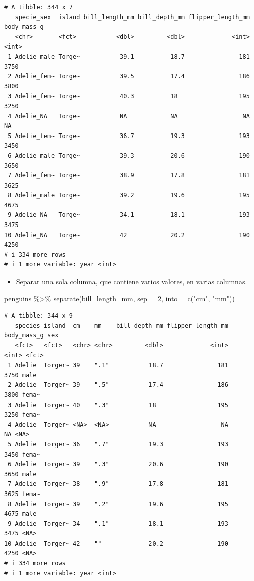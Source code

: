 \documentclass[
  letterpaper,
  DIV=11,
  numbers=noendperiod]{scrreprt}
\newenvironment{Shaded}{\begin{snugshade}}{\end{snugshade}}
\newcommand{\AttributeTok}[1]{\textcolor[rgb]{0.40,0.45,0.13}{#1}}
\newcommand{\DecValTok}[1]{\textcolor[rgb]{0.68,0.00,0.00}{#1}}
\newcommand{\FunctionTok}[1]{\textcolor[rgb]{0.28,0.35,0.67}{#1}}
\newcommand{\NormalTok}[1]{\textcolor[rgb]{0.00,0.23,0.31}{#1}}
\newcommand{\SpecialCharTok}[1]{\textcolor[rgb]{0.37,0.37,0.37}{#1}}
\newcommand{\StringTok}[1]{\textcolor[rgb]{0.13,0.47,0.30}{#1}}
\providecommand{\tightlist}{%
  \setlength{\itemsep}{0pt}\setlength{\parskip}{0pt}}\usepackage{longtable,booktabs,array}
\begin{document}
\begin{verbatim}
# A tibble: 344 x 7
   specie_sex  island bill_length_mm bill_depth_mm flipper_length_mm body_mass_g
   <chr>       <fct>           <dbl>         <dbl>             <int>       <int>
 1 Adelie_male Torge~           39.1          18.7               181        3750
 2 Adelie_fem~ Torge~           39.5          17.4               186        3800
 3 Adelie_fem~ Torge~           40.3          18                 195        3250
 4 Adelie_NA   Torge~           NA            NA                  NA          NA
 5 Adelie_fem~ Torge~           36.7          19.3               193        3450
 6 Adelie_male Torge~           39.3          20.6               190        3650
 7 Adelie_fem~ Torge~           38.9          17.8               181        3625
 8 Adelie_male Torge~           39.2          19.6               195        4675
 9 Adelie_NA   Torge~           34.1          18.1               193        3475
10 Adelie_NA   Torge~           42            20.2               190        4250
# i 334 more rows
# i 1 more variable: year <int>
\end{verbatim}

\begin{itemize}
\tightlist
\item
  Separar una sola columna, que contiene varios valores, en varias
  columnas.
\end{itemize}

\begin{Shaded}
\begin{Highlighting}[]
\NormalTok{penguins }\SpecialCharTok{\%\textgreater{}\%} \FunctionTok{separate}\NormalTok{(bill\_length\_mm, }\AttributeTok{sep =} \DecValTok{2}\NormalTok{, }\AttributeTok{into =} \FunctionTok{c}\NormalTok{(}\StringTok{"cm"}\NormalTok{, }\StringTok{"mm"}\NormalTok{))}
\end{Highlighting}
\end{Shaded}

\begin{verbatim}
# A tibble: 344 x 9
   species island  cm    mm    bill_depth_mm flipper_length_mm body_mass_g sex  
   <fct>   <fct>   <chr> <chr>         <dbl>             <int>       <int> <fct>
 1 Adelie  Torger~ 39    ".1"           18.7               181        3750 male 
 2 Adelie  Torger~ 39    ".5"           17.4               186        3800 fema~
 3 Adelie  Torger~ 40    ".3"           18                 195        3250 fema~
 4 Adelie  Torger~ <NA>  <NA>           NA                  NA          NA <NA> 
 5 Adelie  Torger~ 36    ".7"           19.3               193        3450 fema~
 6 Adelie  Torger~ 39    ".3"           20.6               190        3650 male 
 7 Adelie  Torger~ 38    ".9"           17.8               181        3625 fema~
 8 Adelie  Torger~ 39    ".2"           19.6               195        4675 male 
 9 Adelie  Torger~ 34    ".1"           18.1               193        3475 <NA> 
10 Adelie  Torger~ 42    ""             20.2               190        4250 <NA> 
# i 334 more rows
# i 1 more variable: year <int>
\end{verbatim}
\end{document}
